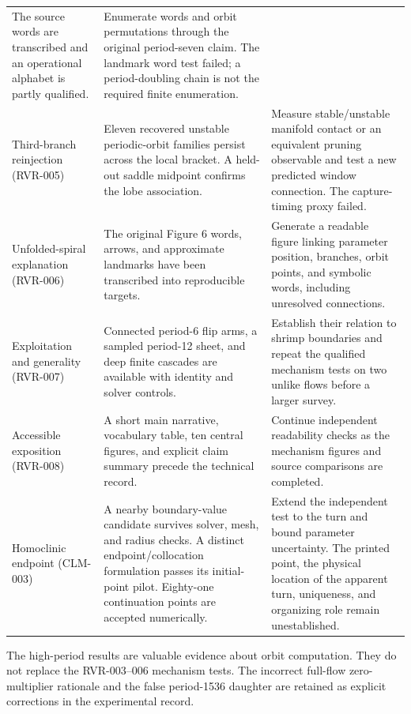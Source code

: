 \begin{longtable}{@{}P{0.22\textwidth}P{0.34\textwidth}P{0.35\textwidth}@{}}
The source words are transcribed and an operational alphabet is partly
qualified. &
Enumerate words and orbit permutations through the original period-seven
claim. The landmark word test failed; a period-doubling chain is not the
required finite enumeration. \\[0.5em]
Third-branch reinjection (RVR-005) &
Eleven recovered unstable periodic-orbit families persist across the local
bracket. A held-out saddle midpoint confirms the lobe association. &
Measure stable/unstable manifold contact or an equivalent pruning
observable and test a new predicted window connection. The capture-timing
proxy failed. \\[0.5em]
Unfolded-spiral explanation (RVR-006) &
The original Figure 6 words, arrows, and approximate landmarks have been
transcribed into reproducible targets. &
Generate a readable figure linking parameter position, branches, orbit
points, and symbolic words, including unresolved connections. \\[0.5em]
Exploitation and generality (RVR-007) &
Connected period-6 flip arms, a sampled period-12 sheet, and deep finite
cascades are available with identity and solver controls. &
Establish their relation to shrimp boundaries and repeat the qualified
mechanism tests on two unlike flows before a larger survey. \\[0.5em]
Accessible exposition (RVR-008) &
A short main narrative, vocabulary table, ten central figures, and explicit
claim summary precede the technical record. &
Continue independent readability checks as the mechanism figures and
source comparisons are completed. \\[0.5em]
Homoclinic endpoint (CLM-003) &
A nearby boundary-value candidate survives solver, mesh, and radius checks.
A distinct endpoint/collocation formulation passes its initial-point pilot.
Eighty-one continuation points are accepted numerically. &
Extend the independent test to the turn and bound parameter uncertainty. The printed
point, the physical location of the apparent turn, uniqueness, and
organizing role remain unestablished. \\
\end{longtable}
\normalsize

The high-period results are valuable evidence about orbit computation.
They do not replace the RVR-003--006 mechanism tests. The incorrect
full-flow zero-multiplier rationale and the false period-1536 daughter are
retained as explicit corrections in the experimental record.
